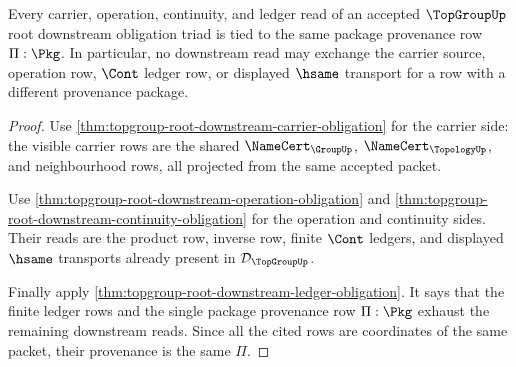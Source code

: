\begin{theorem}
\label{thm:topgroup-root-downstream-provenance-obligation}
Every carrier, operation, continuity, and ledger read of an accepted
$\TopGroupUp$ root downstream obligation triad is tied to the same package
provenance row $\Pi:\Pkg$. In particular, no downstream read may exchange the
carrier source, operation row, $\Cont$ ledger row, or displayed $\hsame$
transport for a row with a different provenance package.
\end{theorem}
\begin{proof}
Use \autoref{thm:topgroup-root-downstream-carrier-obligation} for the carrier
side: the visible carrier rows are the shared $\NameCert_{\GroupUp}$,
$\NameCert_{\TopologyUp}$, and neighbourhood rows, all projected from the same
accepted packet.

Use \autoref{thm:topgroup-root-downstream-operation-obligation} and
\autoref{thm:topgroup-root-downstream-continuity-obligation} for the operation
and continuity sides. Their reads are the product row, inverse row, finite
$\Cont$ ledgers, and displayed $\hsame$ transports already present in
$\mathcal{D}_{\TopGroupUp}$.

Finally apply \autoref{thm:topgroup-root-downstream-ledger-obligation}. It says
that the finite ledger rows and the single package provenance row
$\Pi:\Pkg$ exhaust the remaining downstream reads. Since all the cited rows are
coordinates of the same packet, their provenance is the same $\Pi$.
\end{proof}

